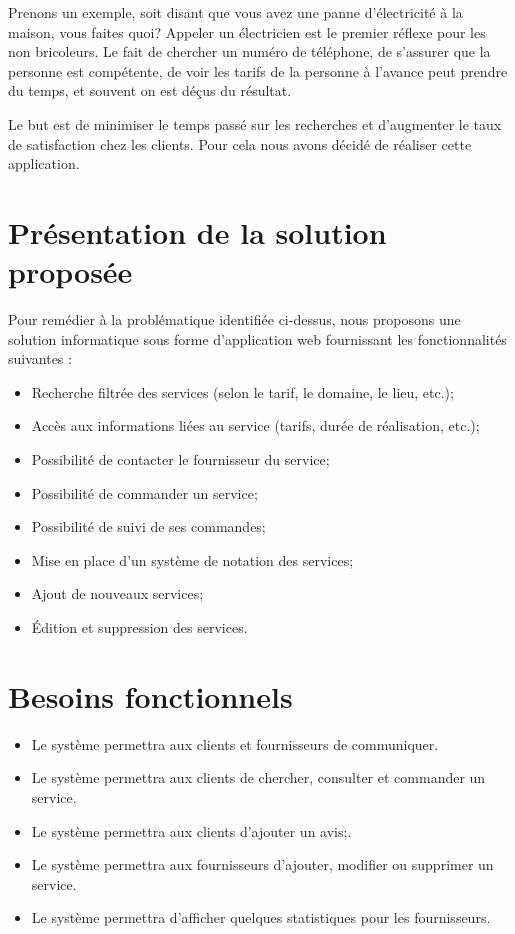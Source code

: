 \documentclass[french]{report}
\begin{document}
Prenons un exemple, soit disant que vous avez une panne d'électricité à la maison, vous faites quoi?
Appeler un électricien est le premier réflexe pour les non bricoleurs. Le fait de chercher
un numéro de téléphone, de s'assurer que la personne est compétente, de voir les tarifs de la personne
à l'avance peut prendre du temps, et souvent on est déçus du résultat.

Le but est de minimiser le temps passé sur les recherches et d'augmenter le taux de satisfaction chez 
les clients. Pour cela nous avons décidé de réaliser cette application.

\section{Présentation de la solution proposée}
Pour remédier à la problématique identifiée ci-dessus, nous proposons une solution informatique sous
forme d'application web fournissant les fonctionnalités suivantes :

\begin{itemize}
	\item Recherche filtrée des services (selon le tarif, le domaine, le lieu, etc.);
	\item Accès aux informations liées au service (tarifs, durée de réalisation, etc.);
	\item Possibilité de contacter le fournisseur du service;
	\item Possibilité de commander un service; 
	\item Possibilité de suivi de ses commandes;
	\item Mise en place d'un système de notation des services;
	\item Ajout de nouveaux services;
	\item Édition et suppression des services.
\end{itemize}

\section{Besoins fonctionnels}
\begin{itemize}
	\item Le système permettra aux clients et fournisseurs de communiquer.
	\item Le système permettra aux clients de chercher, consulter et commander un service.
	\item Le système permettra aux clients d'ajouter un avis;.
	\item Le système permettra aux fournisseurs d'ajouter, modifier ou supprimer un service.
	\item Le système permettra d'afficher quelques statistiques pour les fournisseurs.
\end{itemize}
\end{document}
